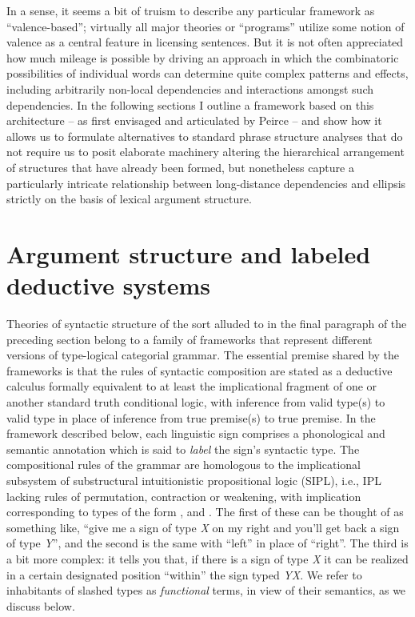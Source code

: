 \documentclass[output=paper,colorlinks,citecolor=brown]{langscibook}
\begin{document}
In a sense, it seems a bit of truism to describe any particular
framework as ``valence-based''; virtually all major theories or
``programs'' utilize some notion of valence as a central feature in
licensing sentences. But it is not often appreciated how much mileage
is possible by driving an approach in which the combinatoric
possibilities of individual words can determine quite complex
patterns and effects, including arbitrarily non-local dependencies and
interactions amongst such dependencies. In the following sections I
outline a framework based on this architecture -- as first envisaged
and articulated by Peirce -- and show how it allows us to formulate
alternatives to standard phrase structure analyses that do not require
us to posit elaborate machinery altering the hierarchical arrangement
of structures that have already been formed, but nonetheless capture a
particularly intricate relationship between long-distance dependencies
and ellipsis strictly on the basis of lexical argument structure.



\section{Argument structure and labeled deductive systems\label{sec:argstruc}}

Theories of syntactic structure of the sort alluded to in the final
paragraph of the preceding section belong to a family of frameworks
that represent different versions of type-logical categorial grammar.
The essential premise shared by the frameworks is that the rules of
syntactic composition are stated as a deductive calculus formally
equivalent to at least the implicational fragment of one or another
standard truth conditional logic, with inference from valid type(s) to
valid type in place of inference from true premise(s) to true
premise. In the framework described below, each linguistic sign
comprises a phonological and semantic annotation which is said to
\emph{label} the sign's syntactic type. The compositional rules of
the grammar are homologous to the implicational subsystem of
substructural intuitionistic propositional logic (SIPL), i.e.,
IPL lacking rules of permutation, contraction or weakening, with implication
corresponding to types of the form , 
 and . The
first of these can be thought of as something like, ``give me a sign of
type \textit{X} on my right and you'll get back a sign of type  \textit{Y}'', and the
second is the same with ``left'' in place of ``right''. The third is a bit
more complex: it tells you that, if there is a sign of type \textit{X} it can be
realized in a certain designated position ``within'' the sign typed
\textit{Y}\vs\textit{X}. We refer to inhabitants of slashed types as
\emph{functional} terms, in view of their semantics, as we discuss below.
\end{document}

